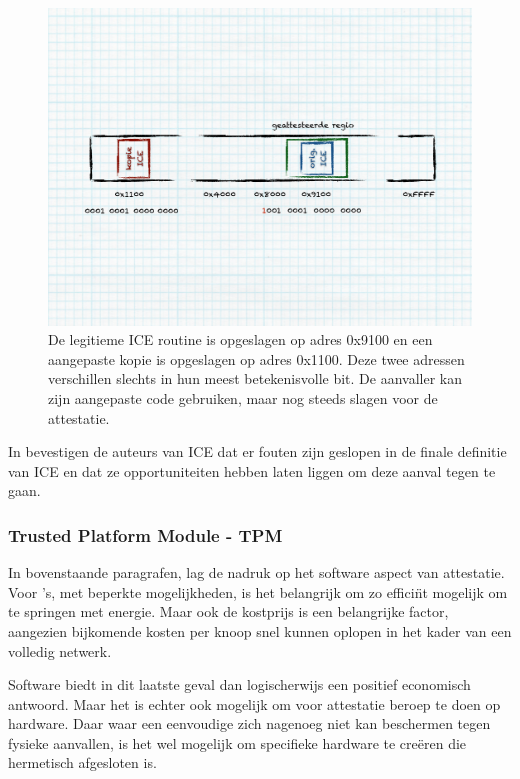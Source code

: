 \begin{figure}[ht]
  \centering
  \includegraphics[width=0.9\linewidth]{resources/attestation-ice-copy.pdf}
  \caption[Omzeilen van ICE-gebaseerde software-attestatie]{De legitieme ICE
  routine is opgeslagen op adres 0x9100 en een aangepaste kopie is opgeslagen
  op adres 0x1100. Deze twee adressen verschillen slechts in hun meest
  betekenisvolle bit. De aanvaller kan zijn aangepaste code gebruiken, maar nog
  steeds slagen voor de attestatie.}
  \label{fig:attestation-ice-copy}
\end{figure}

In \citep{perrig2010refutation} bevestigen de auteurs van ICE dat er fouten zijn
geslopen in de finale definitie van ICE en dat ze opportuniteiten hebben laten
liggen om deze aanval tegen te gaan.

\subsubsection*{Trusted Platform Module - TPM}

In bovenstaande paragrafen, lag de nadruk op het software aspect van
attestatie. Voor \mcu's, met beperkte mogelijkheden, is het belangrijk om zo
effici\"nt mogelijk om te springen met energie. Maar ook de kostprijs is een
belangrijke factor, aangezien bijkomende kosten per knoop snel kunnen oplopen
in het kader van een volledig netwerk.

Software biedt in dit laatste geval dan logischerwijs een positief economisch
antwoord. Maar het is echter ook mogelijk om voor attestatie beroep te doen op
hardware. Daar waar een eenvoudige \mcu zich nagenoeg niet kan beschermen tegen
fysieke aanvallen, is het wel mogelijk om specifieke hardware te cre\"eren die
hermetisch afgesloten is.

